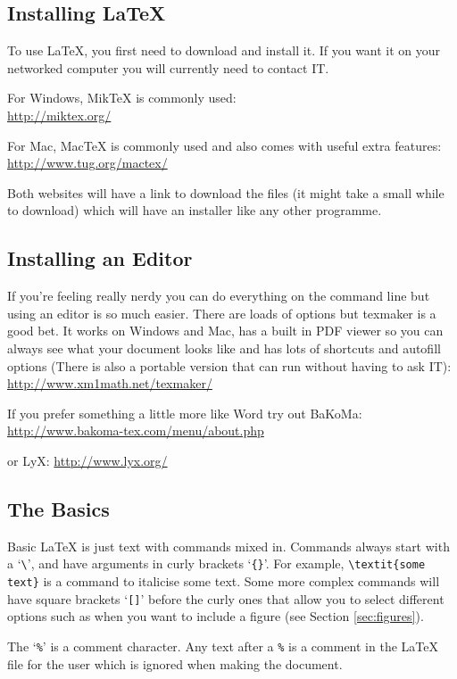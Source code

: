 \documentclass[11pt,a4paper,oneside]{article}
\begin{document}
\subsection{Installing \LaTeX}
To use \LaTeX, you first need to download and install it.  If you want it on your networked computer you will currently need to contact IT. 

For Windows, MikTeX is commonly used:\\
\url{http://miktex.org/}

For Mac,  MacTeX is commonly used and also comes with useful extra features:\\
\url{http://www.tug.org/mactex/}

Both websites will have a link to download the files (it might take a small while to download) which will have an installer like any other programme. 

\subsection{Installing an Editor}
If you're feeling really nerdy you can do everything on the command line but using an editor is so much easier.  There are loads of options but texmaker is a good bet.  It works on Windows and Mac, has a built in PDF viewer so you can always see what your document looks like and has lots of shortcuts and autofill options (There is also a portable version that can run without having to ask IT):\\
\url{http://www.xm1math.net/texmaker/}

If you prefer something a little more like Word try out BaKoMa:
\url{http://www.bakoma-tex.com/menu/about.php}

or LyX:
\url{http://www.lyx.org/}

\subsection{The Basics}
Basic \LaTeX{} is just text with commands mixed in.  Commands always start with a `\verb!\!', and have arguments in curly brackets `\verb!{}!'. For example, \verb!\textit{some text}! is a command to italicise some text. Some more complex commands will have square brackets `\verb![]!' before the curly ones that allow you to select different options such as when you want to include a figure (see Section \ref{sec:figures}).

The `\verb!%!' is a comment character.  Any text after a \verb!%! is a comment in the \LaTeX{} file for the user which is ignored when making the document.
\end{document}
